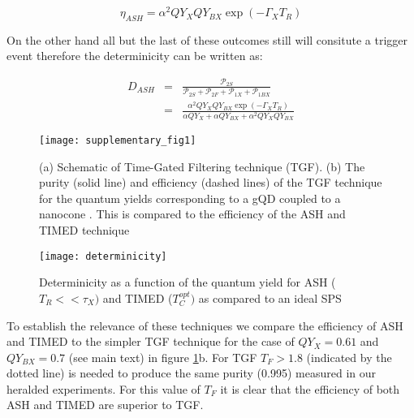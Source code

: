 \documentclass[reprint,onecolumn]{revtex4-1}
\begin{document}
\begin{equation*}
\eta_{ASH}=\alpha^{2}QY_{X}QY_{BX}\exp\left(-\Gamma_{X}T_{R}\right)
\end{equation*}

On the other hand all but the last of these outcomes still will consitute
a trigger event therefore the determinicity can be written as: 

\begin{eqnarray*}
D_{ASH} & = & \frac{\mathscr{\mathcal{\mathscr{P}}}_{2S}}{\mathscr{\mathcal{\mathscr{P}}}_{2S}+\mathscr{\mathcal{\mathscr{P}}}_{2F}+\mathscr{\mathcal{\mathscr{P}}}_{1X}+\mathscr{\mathcal{\mathscr{P}}}_{1BX}}\nonumber \\
 & = & \frac{\alpha^{2}QY_{X}QY_{BX}\exp\left(-\Gamma_{X}T_{R}\right)}{\alpha QY_{X}+\alpha QY_{BX}+\alpha^{2}QY_{X}QY_{BX}}
\end{eqnarray*}

\begin{figure}
\begin{centering}
\texttt{[image: supplementary\_fig1]}
\par\end{centering}
\caption{(a) Schematic of Time-Gated Filtering technique (TGF). (b) The purity (solid line) and efficiency (dashed lines) of the TGF technique for the quantum yields corresponding to a gQD coupled to a nanocone \cite{Matsuzaki2017StrongAntenna}. This is compared to the efficiency of the ASH and TIMED technique \label{fig: TGF}}
\end{figure}

\begin{figure}
\begin{centering}
\texttt{[image: determinicity]}
\par\end{centering}
\caption{Determinicity as a function of the quantum yield for ASH ($T_{R}<<\tau_X)$
and TIMED ($T_{C}^{opt})$ as compared to an ideal SPS \label{fig:Determinicity}}
\end{figure}

To establish the relevance of these techniques we compare the efficiency of ASH and TIMED to the simpler TGF technique for the case of $QY_X=0.61$ and $QY_{BX}=0.7$ (see main text) \cite{Matsuzaki2017StrongAntenna} in figure \ref{fig: TGF}b. 
For TGF $T_F>1.8$ (indicated by the dotted line) is needed to produce the same purity (0.995)  measured in our heralded experiments.
For this value of $T_F$ it is clear that the efficiency of both ASH and TIMED are superior to TGF.
\end{document}
